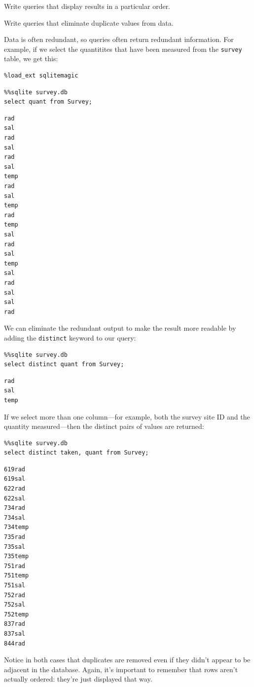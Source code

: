 \documentclass{book}
\begin{document}
\begin{objectives}
\begin{swcitemize}
\item
  Write queries that display results in a particular order.
\item
  Write queries that eliminate duplicate values from data.
\end{swcitemize}
\end{objectives}

Data is often redundant, so queries often return redundant information.
For example, if we select the quantitites that have been measured from
the \texttt{survey} table, we get this:

\begin{verbatim}
%load_ext sqlitemagic
\end{verbatim}

\begin{verbatim}
%%sqlite survey.db
select quant from Survey;
\end{verbatim}

\begin{verbatim}
rad
sal
rad
sal
rad
sal
temp
rad
sal
temp
rad
temp
sal
rad
sal
temp
sal
rad
sal
sal
rad
\end{verbatim}

We can eliminate the redundant output to make the result more readable
by adding the \texttt{distinct} keyword to our query:

\begin{verbatim}
%%sqlite survey.db
select distinct quant from Survey;
\end{verbatim}

\begin{verbatim}
rad
sal
temp
\end{verbatim}

If we select more than one column---for example, both the survey site ID
and the quantity measured---then the distinct pairs of values are
returned:

\begin{verbatim}
%%sqlite survey.db
select distinct taken, quant from Survey;
\end{verbatim}

\begin{verbatim}
619rad
619sal
622rad
622sal
734rad
734sal
734temp
735rad
735sal
735temp
751rad
751temp
751sal
752rad
752sal
752temp
837rad
837sal
844rad
\end{verbatim}

Notice in both cases that duplicates are removed even if they didn't
appear to be adjacent in the database. Again, it's important to remember
that rows aren't actually ordered: they're just displayed that way.
\end{document}
